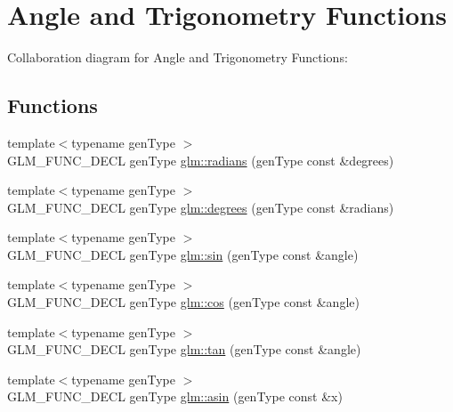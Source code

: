 \hypertarget{group__core__func__trigonometric}{}\section{Angle and Trigonometry Functions}
\label{group__core__func__trigonometric}
Collaboration diagram for Angle and Trigonometry Functions\+:
\subsection*{Functions}
\begin{DoxyCompactItemize}
\item 
{\footnotesize template$<$typename gen\+Type $>$ }\\G\+L\+M\+\_\+\+F\+U\+N\+C\+\_\+\+D\+E\+C\+L gen\+Type \hyperlink{group__core__func__trigonometric_ga431d31cdb060059bc5b0696e212f1453}{glm\+::radians} (gen\+Type const \&degrees)
\item 
{\footnotesize template$<$typename gen\+Type $>$ }\\G\+L\+M\+\_\+\+F\+U\+N\+C\+\_\+\+D\+E\+C\+L gen\+Type \hyperlink{group__core__func__trigonometric_gaf4e5661bd1c993f6090d49e988a4c78a}{glm\+::degrees} (gen\+Type const \&radians)
\item 
{\footnotesize template$<$typename gen\+Type $>$ }\\G\+L\+M\+\_\+\+F\+U\+N\+C\+\_\+\+D\+E\+C\+L gen\+Type \hyperlink{group__core__func__trigonometric_gafbab21016b7f3bc21afb09a7e42e2df1}{glm\+::sin} (gen\+Type const \&angle)
\item 
{\footnotesize template$<$typename gen\+Type $>$ }\\G\+L\+M\+\_\+\+F\+U\+N\+C\+\_\+\+D\+E\+C\+L gen\+Type \hyperlink{group__core__func__trigonometric_gac6708d4f0895dc79b65f50db00840167}{glm\+::cos} (gen\+Type const \&angle)
\item 
{\footnotesize template$<$typename gen\+Type $>$ }\\G\+L\+M\+\_\+\+F\+U\+N\+C\+\_\+\+D\+E\+C\+L gen\+Type \hyperlink{group__core__func__trigonometric_ga328aeb0de4f312dc3d200cb929715d44}{glm\+::tan} (gen\+Type const \&angle)
\item 
{\footnotesize template$<$typename gen\+Type $>$ }\\G\+L\+M\+\_\+\+F\+U\+N\+C\+\_\+\+D\+E\+C\+L gen\+Type \hyperlink{group__core__func__trigonometric_gafca5e8c71ea06be0840227b4aafc5680}{glm\+::asin} (gen\+Type const \&x)
\item 

\end{DoxyCompactItemize}
